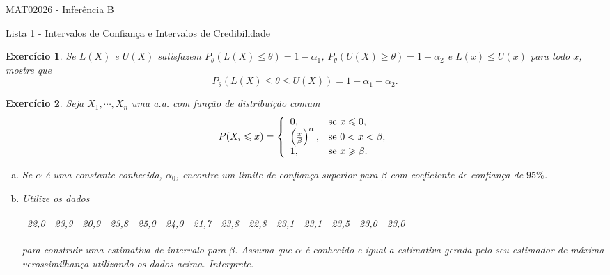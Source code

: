 \documentclass[letter,11pt]{article}
\newtheorem{exer}{Exercício}
\begin{document}
\begin{center}{ \Large MAT02026 - Inferência B }\end{center}

\begin{center}
{\large  \sc Lista 1 - Intervalos de Confiança e Intervalos de Credibilidade}
\end{center}
\vspace{5mm}

\begin{exer} \rm
Se $L(X)$ e $U(X)$ satisfazem $P_\theta(L(X)\leqslant\theta)=1-\alpha_1$, 
$P_\theta(U(X)\geqslant\theta)=1-\alpha_2$ e $L(x) \leqslant U(x)$ para todo 
$x$, mostre que
\[P_\theta(L(X)\leqslant\theta\leqslant U(X))=1-\alpha_1-\alpha_2.\]
\end{exer}



\begin{exer} \rm
Seja $X_1,\cdots,X_n$ uma a.a. com função de distribuição comum
\[P(X_i\leqslant x)=\left\{
                          \begin{array}{ll}
                            0, & \hbox{se }x\leqslant0, \\
                            \left(\frac{x}{\beta}\right)^\alpha, & \hbox{se }0<x<\beta, \\
                            1, & \hbox{se }x\geqslant\beta.
                          \end{array}
                        \right.
\]
\begin{enumerate}[a)]
  \item Se $\alpha$ é uma constante conhecida, $\alpha_0$, encontre um limite de confiança superior para $\beta$ com coeficiente de confiança de $95\%$.
  \item Utilize os dados
\begin{tabular}{cccccccccccccc}
 22,0 & 23,9 & 20,9 & 23,8 & 25,0 & 24,0 & 21,7 & 23,8 & 22,8 & 23,1 & 23,1 & 23,5 & 23,0 & 23,0 \\
\end{tabular}
\noindent para construir uma estimativa de intervalo para $\beta$. Assuma que $\alpha$ é conhecido e igual a estimativa gerada pelo seu estimador de máxima verossimilhança utilizando os dados acima. Interprete.
\end{enumerate}
\end{exer}
\end{document}
